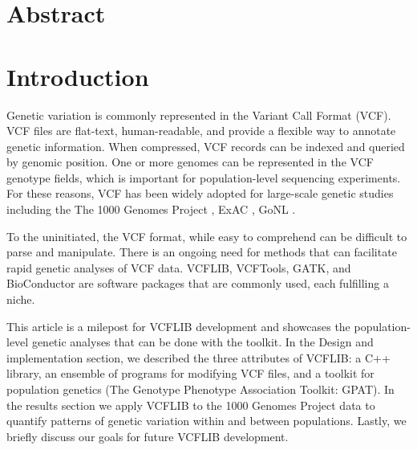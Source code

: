 \documentclass[10pt,letterpaper]{article}
\begin{document}
\section*{Abstract}




\linenumbers

\section*{Introduction}

Genetic variation is commonly represented in the Variant Call Format (VCF)\cite{vcftools}.  VCF files are flat-text, human-readable, and provide a flexible way to annotate genetic information.  When compressed, VCF records can be indexed and queried by genomic position\cite{tabix}. One or more genomes can be represented in the VCF genotype fields, which is important for population-level sequencing experiments. For these reasons, VCF has been widely adopted for large-scale genetic studies including the The 1000 Genomes Project \cite{1kg}, ExAC \cite{exac}, GoNL \cite{gonl}.

To the uninitiated, the VCF format, while easy to comprehend can be difficult to parse and manipulate. There is an ongoing need for methods that can facilitate rapid genetic analyses of VCF data.  VCFLIB, VCFTools\cite{vcftools}, GATK,  and BioConductor are software packages that are commonly used, each fulfilling a niche. 

This article is a milepost for VCFLIB development and showcases the population-level genetic analyses that can be done with the toolkit. In the Design and implementation section, we described the three attributes of VCFLIB: a C++ library, an ensemble of programs for modifying VCF files, and a toolkit for population genetics (The Genotype Phenotype Association Toolkit: GPAT). In the results section we apply VCFLIB to the 1000 Genomes Project data to quantify patterns of genetic variation within and between populations.  Lastly, we briefly discuss our goals for future VCFLIB development.



\end{document}
